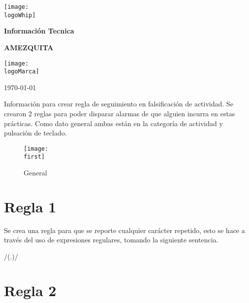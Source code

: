 \documentclass[a4paper]{article}
\newcommand{\canal}{AMEZQUITA}
\newcommand{\startDate}{\today}
\newcommand{\logoMarca}{img/teramindComplete.png}
\newcommand{\logoWhip}{img/largeW.png}
\newcommand{\first}{img/captura1.png}
\begin{document}
    \begin{titlepage}
        \centering
        \texttt{[image: \\logoWhip]}
        \par\vspace{1cm}
        {\LARGE\textbf{Información Tecnica}}
        \par\vspace{0.9cm}
        {\Huge\bfseries\textcolor{greenPortada}{\canal}}
        \vfill

        \par\vspace{0.4cm}
        \texttt{[image: \\logoMarca]}
        \vfill

        \par\vspace{1cm}

        {\large\startDate\par}

    \end{titlepage}
    \clearpage

    Información para crear regla de seguimiento en falsificación de actividad.
    Se crearon 2 reglas para poder disparar alarmas de que alguien incurra en estas prácticas.
    Como dato general ambas están en la categoría de actividad y pulsación de teclado.

    \begin{figure}[H] 
        \centering 
        \texttt{[image: \\first]} 
        \caption{General} 
    \end{figure} 
    
    \section{Regla 1}
    Se crea una regla para que se reporte cualquier carácter repetido, esto se hace a través del uso de expresiones regulares, tomando la siguiente sentencia.
    
    /(.)/



    \section{Regla 2}

    
\end{document}
